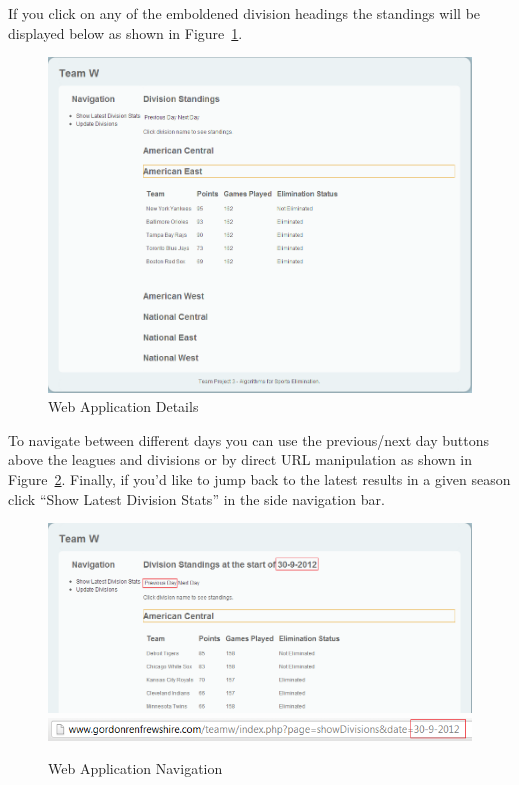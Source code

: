 If you click on any of the emboldened division headings the standings will be
displayed below as shown in Figure~\ref{fig:WEBINFO}.

\begin{figure}
\includegraphics[width=\linewidth,keepaspectratio]{images/userManualWeb2.png}
\caption{Web Application Details}\label{fig:WEBINFO}
\end{figure}

To navigate between different days you can use the previous/next day buttons
above the leagues and divisions or by direct URL manipulation as shown
in Figure~\ref{fig:WEBNAV}. Finally, if you'd like to jump back to the
latest results in a given season click ``Show Latest Division Stats''
in the side navigation bar.

\begin{figure}
\includegraphics[width=\linewidth,keepaspectratio]{images/userManualWeb3.png}
\includegraphics[width=\linewidth,keepaspectratio]{images/userManualWeb4.png}
\caption{Web Application Navigation}\label{fig:WEBNAV}
\end{figure}

